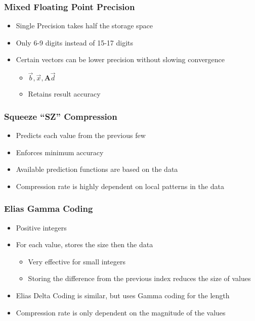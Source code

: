 \documentclass{beamer}
\newcommand{\mat}[1]{\mathbf{#1}}
\begin{document}
\begin{frame}
	\frametitle{Mixed Floating Point Precision}
	\begin{itemize}
		\item Single Precision takes half the storage space
		\item Only 6-9 digits instead of 15-17 digits
		\item Certain vectors can be lower precision without slowing convergence
		\begin{itemize}
			\item \(\vec{b}, \vec{x}, \mat{A}\vec{d}\)
			\item Retains result accuracy
		\end{itemize}
	\end{itemize}
\end{frame}

\begin{frame}
	\frametitle{Squeeze ``SZ'' Compression}
	\begin{itemize}
		\item Predicts each value from the previous few
		\item Enforces minimum accuracy
		\pause
		\item Available prediction functions are based on the data
		\pause
		\item Compression rate is highly dependent on local patterns in the data
	\end{itemize}
\end{frame}

\begin{frame}
	\frametitle{Elias Gamma Coding}
	\begin{itemize}
		\item Positive integers
		\item For each value, stores the size then the data
		\begin{itemize}
			\item Very effective for small integers
			\item Storing the difference from the previous index reduces the size of values
		\end{itemize}
		\pause
		\item Elias Delta Coding is similar, but uses Gamma coding for the length
		\pause
		\item Compression rate is only dependent on the magnitude of the values
	\end{itemize}
\end{frame}
\end{document}
